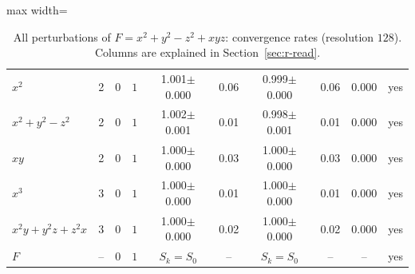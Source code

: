 \documentclass[12pt, a4paper]{article}
\theoremstyle{plain}
\theoremstyle{definition}
\theoremstyle{remark}
\theoremstyle{definition}
\begin{document}
\begin{table}[!h]
\begin{adjustbox}{max width=\textwidth}
\begin{tabular}{l c l c c c c c c c}
$x^2$ & 2 & $0$ & $1$ & 1.001{\scriptsize$\pm$0.000} & 0.06 & 0.999{\scriptsize$\pm$0.000} & 0.06 & 0.000 & yes \\
$x^2+y^2-z^2$ & 2 & $0$ & $1$ & 1.002{\scriptsize$\pm$0.001} & 0.01 & 0.998{\scriptsize$\pm$0.001} & 0.01 & 0.000 & yes \\
$xy$ & 2 & $0$ & $1$ & 1.000{\scriptsize$\pm$0.000} & 0.03 & 1.000{\scriptsize$\pm$0.000} & 0.03 & 0.000 & yes \\
$x^3$ & 3 & $0$ & $1$ & 1.000{\scriptsize$\pm$0.000} & 0.01 & 1.000{\scriptsize$\pm$0.000} & 0.01 & 0.000 & yes \\
$x^2y+y^2z+z^2x$ & 3 & $0$ & $1$ & 1.000{\scriptsize$\pm$0.000} & 0.02 & 1.000{\scriptsize$\pm$0.000} & 0.02 & 0.000 & yes \\
$F$ & -- & $0$ & $1$ & $S_k=S_0$ & -- & $S_k=S_0$ & -- & -- & yes \\
\bottomrule
\end{tabular}
\end{adjustbox}
\caption[Rates for $x^2+y^2-z^2+xyz$]{All perturbations of $F=x^2+y^2-z^2+xyz$: convergence rates (resolution $128$). Columns are explained in Section~\ref{sec:r-read}.}
\label{tab:r-A1-rates}
\end{table}
\end{document}
